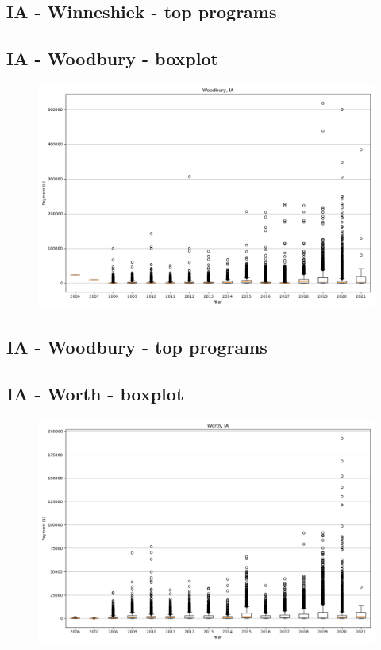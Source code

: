 \subsection*{IA - Winneshiek - top programs}

\newpage
\subsection*{IA - Woodbury - boxplot}
\begin{figure}[h]
\centering
\includegraphics[width=7in]{../output/boxplots/counties/Woodbury-IA_boxplot.png}
\end{figure}


\subsection*{IA - Woodbury - top programs}

\newpage
\subsection*{IA - Worth - boxplot}
\begin{figure}[h]
\centering
\includegraphics[width=7in]{../output/boxplots/counties/Worth-IA_boxplot.png}
\end{figure}


